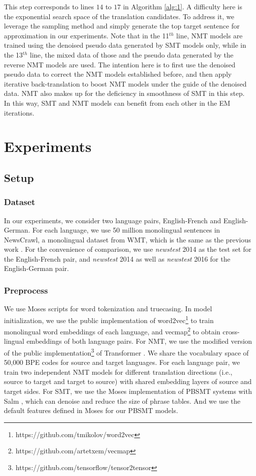 \documentclass[letterpaper]{article} \usepackage{aaai19}  \usepackage{times}  \usepackage{helvet}  \usepackage{courier}  \usepackage{url}  \usepackage{graphicx}  \usepackage{amsmath}
\begin{document}
This step corresponds to lines $14$ to $17$ in Algorithm \ref{alg:1}. A difficulty here is the exponential search space of the translation candidates. To address it, we leverage the sampling method \cite{shen2015minimum} and simply generate the top target sentence for approximation in our experiments. Note that in the 11$^{th}$ line, NMT models are trained using the denoised pseudo data generated by SMT models only, while in the 13$^{th}$ line, the mixed data of those and the pseudo data generated by the reverse NMT models are used. The intention here is to first use the denoised pseudo data to correct the NMT models established before, and then apply iterative back-translation to boost NMT models under the guide of the denoised data. NMT also makes up for the deficiency in smoothness of SMT in this step. In this way, SMT and NMT models can benefit from each other in the EM iterations.

\section{Experiments}
\subsection{Setup}
\subsubsection{Dataset}
In our experiments, we consider two language pairs, English-French and English-German. For each language, we use 50 million monolingual sentences in NewsCrawl, a monolingual dataset from WMT, which is the same as the previous work \cite{artetxe2017unsupervised,lample2018phrase}. For the convenience of comparison, we use \emph{newstest} 2014 as the test set for the English-French pair, and \emph{newstest} 2014 as well as \emph{newstest} 2016 for the English-German pair.
\subsubsection{Preprocess}
We use Moses scripts for word tokenization and truecasing. In model initialization, we use the public implementation of word2vec\footnote{https://github.com/tmikolov/word2vec} to train monolingual word embeddings of each language, and vecmap\footnote{https://github.com/artetxem/vecmap} to obtain cross-lingual embeddings of both language pairs. For NMT, we use the modified version of the public implementation\footnote{https://github.com/tensorflow/tensor2tensor} of Transformer \cite{vaswani2017attention}. We share the vocabulary space of 50,000 BPE codes \cite{sennrich2015neural} for source and target languages. For each language pair, we train two independent NMT models for different translation directions (i.e., source to target and target to source) with shared embedding layers of source and target sides. For SMT, we use the Moses implementation of PBSMT systems with Salm \cite{johnson2007improving}, which can denoise and reduce the size of phrase tables. And we use the default features defined in Moses for our PBSMT models. 
\end{document}
